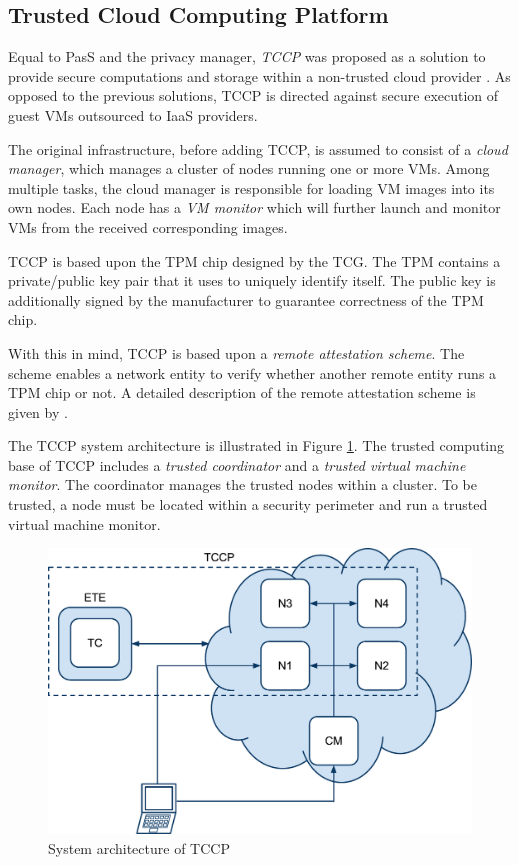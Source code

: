 \documentclass[pdftex,english,10pt,b5paper,twoside]{book}
\begin{document}
\subsection{Trusted Cloud Computing Platform}

Equal to \acl{PasS} and the privacy manager, \emph{\ac{TCCP}} was proposed as a
solution to provide secure computations and storage within a non-trusted cloud
provider \cite{tccp}. As opposed to the previous solutions, \ac{TCCP} is
directed against secure execution of guest \acp{VM} outsourced to \ac{IaaS}
providers.

The original infrastructure, before adding \ac{TCCP}, is assumed to
consist of a \emph{cloud manager}, which manages a cluster of nodes running one or more
\acp{VM}. Among multiple tasks, the cloud manager is responsible for loading \ac{VM}
images into its own nodes.  Each node has a \emph{\ac{VM} monitor} which will further
launch and monitor \acp{VM} from the received corresponding images.

\ac{TCCP} is based upon the \acf{TPM} chip designed by the \acl{TCG}. The
\ac{TPM} contains a private/public key pair that it uses to uniquely identify
itself. The public key is additionally signed by the manufacturer to guarantee
correctness of the \ac{TPM} chip.

With this in mind, \ac{TCCP} is based upon a \emph{remote attestation scheme}.
The scheme enables a network entity to verify whether another remote entity
runs a \ac{TPM} chip or not. A detailed description of the remote attestation scheme
is given by \citet{tccp}.

The \ac{TCCP} system architecture is illustrated in Figure \ref{fig:RW:TCCP}.
The trusted computing base of \ac{TCCP} includes a \emph{trusted coordinator}
and a \emph{trusted virtual machine monitor}. The coordinator manages the
trusted nodes within a cluster. To be trusted, a node must be located within a
security perimeter and run a trusted virtual machine monitor.

\begin{figure}[h!]
    \centering
    \includegraphics[scale=0.4]{ArchitectureTCCP.pdf}
    \caption{System architecture of TCCP}
    \label{fig:RW:TCCP}
\end{figure}
\end{document}
